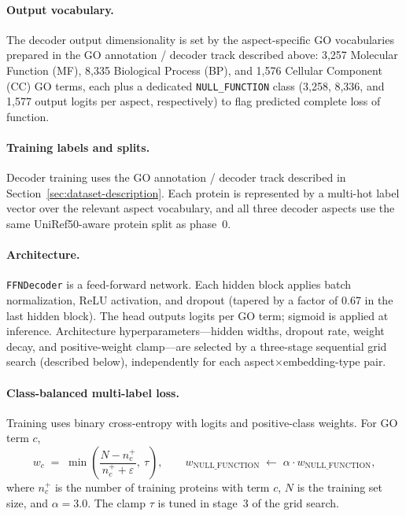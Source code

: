 \documentclass[11pt,a4paper]{article}
\begin{document}
\paragraph{Output vocabulary.}
The decoder output dimensionality is set by the aspect-specific GO vocabularies prepared in the GO annotation / decoder track described above: 3{,}257 Molecular Function (MF), 8{,}335 Biological Process (BP), and 1{,}576 Cellular Component (CC) GO terms, each plus a dedicated \texttt{NULL\_FUNCTION} class (3{,}258, 8{,}336, and 1{,}577 output logits per aspect, respectively) to flag predicted complete loss of function.

\paragraph{Training labels and splits.}
Decoder training uses the GO annotation / decoder track described in Section~\ref{sec:dataset-description}. Each protein is represented by a multi-hot label vector over the relevant aspect vocabulary, and all three decoder aspects use the same UniRef50-aware protein split as phase~0.

\paragraph{Architecture.}
\texttt{FFNDecoder} is a feed-forward network. Each hidden block applies batch normalization, ReLU activation, and dropout (tapered by a factor of 0.67 in the last hidden block). The head outputs logits per GO term; sigmoid is applied at inference. Architecture hyperparameters---hidden widths, dropout rate, weight decay, and positive-weight clamp---are selected by a three-stage sequential grid search (described below), independently for each aspect$\times$embedding-type pair.

\paragraph{Class-balanced multi-label loss.}
Training uses binary cross-entropy with logits and positive-class weights. For GO term $c$,
\[
w_c \;=\; \min\!\left(\frac{N - n_c^{+}}{n_c^{+}+\varepsilon},\ \tau\right),\qquad
w_{\text{NULL\_FUNCTION}} \;\leftarrow\; \alpha \cdot w_{\text{NULL\_FUNCTION}},
\]
where $n_c^{+}$ is the number of training proteins with term $c$, $N$ is the training set size, and $\alpha=3.0$. The clamp $\tau$ is tuned in stage~3 of the grid search.
\end{document}
